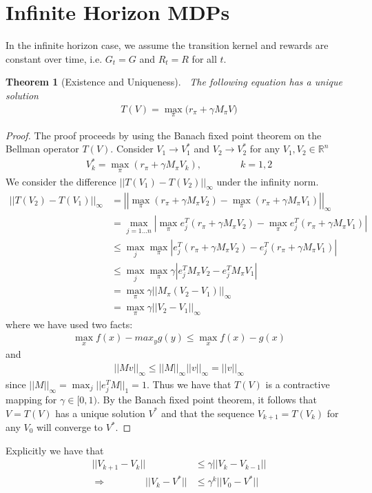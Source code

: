 \documentclass[]{article}
\newtheorem{theorem}{Theorem}
\newtheorem{proof}{Proof}
\newcommand{\mb}{\mathbb}
\begin{document}
\section*{Infinite Horizon MDPs}
In the infinite horizon case, we assume the transition kernel and rewards are constant over time, i.e. $G_t = G$ and $R_t = R$ for all $t$.  
\begin{theorem}[Existence and Uniqueness]
$\ $ \newline
 The following equation has a unique solution
\begin{align}
T(V) = \max_\pi \Big(r_\pi + \gamma M_\pi V \Big)
\end{align}
\end{theorem}
\begin{proof}
The proof proceeds by using the Banach fixed point theorem on the Bellman operator $T(V)$.  
Consider $V_1 \rightarrow V_1^*$ and $V_2 \rightarrow V_2^*$ for any $V_1, V_2 \in \mb{R}^n$
\begin{align}
V_k^* = \max_{\pi} (r_\pi + \gamma M_\pi V_k), \qquad \qquad k=1,2
\end{align}
We consider the difference $||T(V_1) - T(V_2)||_\infty$ under the infinity norm.  
\begin{align}
\left|\left| T(V_2) - T(V_1) \right| \right|_\infty 
& = \left|\left| \max_\pi (r_\pi + \gamma M_\pi V_2) - \max_\pi (r_\pi + \gamma M_\pi V_1) \right|\right|_\infty \\
& = 
\max_{j=1...n}\left|\max_\pi e_j^T(r_\pi + \gamma M_\pi V_2) - \max_\pi e_j^T(r_\pi + \gamma M_\pi V_1)\right| \\
& \leq \max_j \max_\pi \left| e_j^T(r_\pi + \gamma M_\pi V_2) - e_j^T(r_\pi + \gamma M_\pi V_1) \right| \\
& \leq \max_j \max_\pi \gamma \left| e_j^T M_\pi V_2 - e_j^T M_\pi V_1 \right| \\
& = \max_\pi \gamma \left|\left| M_\pi (V_2 - V_1) \right|\right|_\infty \\
& = \max_\pi \gamma \left|\left| V_2 - V_1 \right|\right|_\infty
\end{align}
where we have used two facts:
\begin{align}
\max_x f(x) - max_y g(y) \leq \max_x f(x) - g(x)
\end{align}
and
\begin{align}
\left|\left| Mv \right|\right|_\infty
\leq \left|\left| M \right|\right|_\infty \left|\left| v \right|\right|_\infty  = \left|\left| v \right|\right|_\infty 
\end{align}
since $\left|\left| M \right|\right|_\infty = \max_j ||e_j^TM||_1 = 1$. 
Thus we have that $T(V)$ is a contractive mapping for $\gamma \in [0,1)$.  By the Banach fixed point theorem, it follows that $V=T(V)$ has a unique solution $V^*$ and that the sequence $V_{k+1} = T(V_k)$ for any $V_0$ will converge to $V^*$.  
\end{proof}
Explicitly we have that
\begin{align}
|| V_{k+1} -V_k || & \leq \gamma ||V_k - V_{k-1}|| \\
\Rightarrow \qquad \qquad ||V_k - V^*|| & \leq \gamma^k ||V_0 - V^*||
\end{align}
\end{document}
